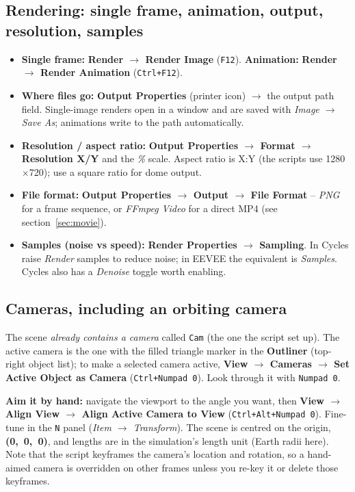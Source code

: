 \documentclass[11pt]{article}
\newcommand{\pc}[1]{\texttt{#1}}
\begin{document}
\subsection{Rendering: single frame, animation, output, resolution, samples}
\begin{itemize}
  \item \textbf{Single frame:} \textbf{Render $\rightarrow$ Render Image}
        (\pc{F12}). \textbf{Animation:} \textbf{Render $\rightarrow$ Render
        Animation} (\pc{Ctrl+F12}).
  \item \textbf{Where files go:} \textbf{Output Properties} (printer icon)
        $\rightarrow$ the output path field. Single-image renders open in a
        window and are saved with \emph{Image $\rightarrow$ Save As}; animations
        write to the path automatically.
  \item \textbf{Resolution / aspect ratio:} \textbf{Output Properties
        $\rightarrow$ Format $\rightarrow$ Resolution X/Y} and the \emph{\%}
        scale. Aspect ratio is X:Y (the scripts use 1280$\times$720); use a
        square ratio for dome output.
  \item \textbf{File format:} \textbf{Output Properties $\rightarrow$ Output
        $\rightarrow$ File Format} -- \emph{PNG} for a frame sequence, or
        \emph{FFmpeg Video} for a direct MP4 (see section~\ref{sec:movie}).
  \item \textbf{Samples (noise vs speed):} \textbf{Render Properties
        $\rightarrow$ Sampling}. In Cycles raise \emph{Render} samples to reduce
        noise; in EEVEE the equivalent is \emph{Samples}. Cycles also has a
        \emph{Denoise} toggle worth enabling.
\end{itemize}
 
\subsection{Cameras, including an orbiting camera}
The scene \emph{already contains a camera} called \pc{Cam} (the one the script
set up). The active camera is the one with the filled
triangle marker in the \textbf{Outliner} (top-right object list); to make a
selected camera active, \textbf{View $\rightarrow$ Cameras $\rightarrow$ Set
Active Object as Camera} (\pc{Ctrl+Numpad~0}). Look through it with
\pc{Numpad~0}.
 
\textbf{Aim it by hand:} navigate the viewport to the angle you want, then
\textbf{View $\rightarrow$ Align View $\rightarrow$ Align Active Camera to View}
(\pc{Ctrl+Alt+Numpad~0}). Fine-tune in the \pc{N} panel (\emph{Item
$\rightarrow$ Transform}). The scene is centred on the origin, \textbf{(0,~0,~0)}, and lengths are in the simulation's length unit (Earth radii here). Note that the script
keyframes the camera's location and rotation, so a hand-aimed camera is
overridden on other frames unless you re-key it or delete those keyframes.
 
\end{document}
